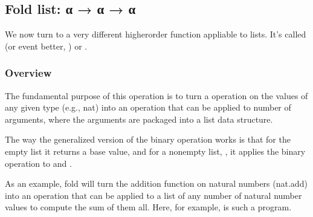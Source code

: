 \documentclass[letterpaper,10pt,english]{sphinxmanual}
\begin{document}
\subsection{Fold list: α → α → α}
\label{\detokenize{A_03_Recursive_Types:fold-list}}
\sphinxAtStartPar
We now turn to a very different higher\sphinxhyphen{}order function
appliable to lists. It’s called  (or event better,
) or .


\subsubsection{Overview}
\label{\detokenize{A_03_Recursive_Types:overview}}
\sphinxAtStartPar
The fundamental purpose of this operation is to turn a
 operation on the values of any given type (e.g.,
nat) into an operation that can be applied to  number
of arguments, where the arguments are packaged into a list
data structure.

\sphinxAtStartPar
The way the generalized version of the binary operation
works is that for the empty list it returns a base value,
and for a non\sphinxhyphen{}empty list, , it applies the binary
operation to  and .

\sphinxAtStartPar
As an example, fold will turn the addition function on
natural numbers (nat.add) into an operation that can be
applied to a list of any number of natural number values
to compute the sum of them all. Here, for example, is
such a program.

\begin{sphinxVerbatim}[commandchars=\\\{\}]
      
   
      

  \PYG{o}{[}\PYG{o}{]}           
  \PYG{o}{[}\PYG{o}{]}          
  \PYG{o}{[}\PYG{o}{]}        
  \PYG{o}{[}\PYG{o}{]}  
\end{sphinxVerbatim}
\end{document}
